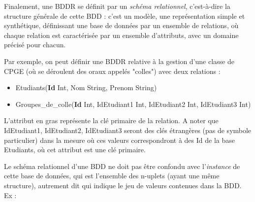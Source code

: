 \documentclass[11pt,a4paper,french,twoside]{PMCours}
\begin{document}
% 
% 
% 

Finalement, une BDDR se définit par un \emph{schéma relationnel}, c'est-à-dire la structure générale de cette BDD : c'est un modèle, une représentation simple et synthétique, définissant une base de données par un ensemble de relations, où chaque relation est caractérisée par un ensemble d'attributs, avec un domaine précisé pour chacun. 

Par exemple, on peut définir une BDDR relative à la gestion d'une classe de CPGE (où se déroulent des oraux appelés "colles") avec deux relations :
\begin{itemize}
 \item Etudiants(\textbf{Id} Int, Nom String, Prenom String)
 \item Groupes\_de\_colle(\textbf{Id} Int, IdEtudiant1 Int, IdEtudiant2 Int, IdEtudiant3 Int)
\end{itemize}

L'attribut en gras représente la clé primaire de la relation. A noter que IdEtudiant1, IdEtudiant2, IdEtudiant3 seront des clés étrangères (pas de symbole particulier) dans la mesure où ces valeurs correspondront à des Id de la base Etudiants, où cet attribut est une clé primaire.

Le schéma relationnel d'une BDD ne doit pas être confondu avec l'\emph{instance} de cette base de données, qui est l'ensemble des n-uplets (ayant une même structure), autrement dit qui indique le jeu de valeurs contenues dans la BDD. Ex :
\end{document}
